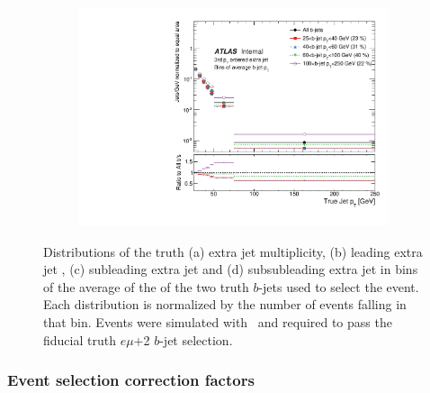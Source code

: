 \begin{figure}
\begin{subfigure}[]{0.45\textwidth}
\end{subfigure}
\begin{subfigure}[]{0.45\textwidth}
\includegraphics[width=\textwidth]{fig/TruthNotReco/BJetPtJet2.pdf}
\end{subfigure}
\caption{Distributions of the truth (a) extra jet multiplicity, (b) leading extra jet \pt, (c) subleading extra jet \pt and (d) subsubleading extra jet \pt in bins of the average of the \pt of the two truth $b$-jets used to select the event. Each distribution is normalized by 
the number of events falling in that bin. Events were simulated with \powpy~\ttbar and required to pass the fiducial truth $e\mu$+2 $b$-jet selection.}
\label{fig:bjetdep}
\end{figure}


\subsubsection{Event selection correction factors}
\label{ss:unfcorr}

